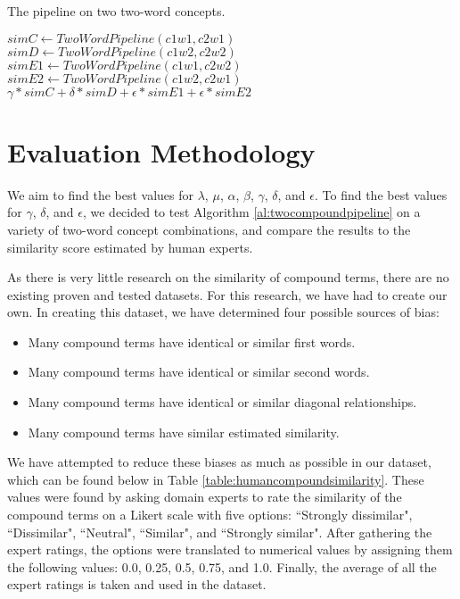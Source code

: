 \documentclass{article}
\begin{document}
\begin{algorithm}
\caption{The pipeline on two two-word concepts.}\label{al:twocompoundpipeline}
\begin{algorithmic}[1]
		\State $\textit{simC} \gets \textit{TwoWordPipeline}(c1w1, c2w1)$
		\State $\textit{simD} \gets \textit{TwoWordPipeline}(c1w2, c2w2)$
		\State $\textit{simE1} \gets \textit{TwoWordPipeline}(c1w1, c2w2)$
		\State $\textit{simE2} \gets \textit{TwoWordPipeline}(c1w2, c2w1)$
		\State \Return $\gamma * \textit{simC} + \delta * \textit{simD} + \epsilon * \textit{simE1} + \epsilon * \textit{simE2}$
	\EndProcedure
\end{algorithmic}
\end{algorithm}

\section{Evaluation Methodology} \label{sec:evalmeth}

We aim to find the best values for $\lambda$, $\mu$, $\alpha$, $\beta$, $\gamma$, $\delta$, and $\epsilon$. To find the best values for $\gamma$, $\delta$, and $\epsilon$, we decided to test Algorithm \ref{al:twocompoundpipeline} on a variety of two-word concept combinations, and compare the results to the similarity score estimated by human experts.

As there is very little research on the similarity of compound terms, there are no existing proven and tested datasets. For this research, we have had to create our own. In creating this dataset, we have determined four possible sources of bias:
\begin{itemize}
	\item Many compound terms have identical or similar first words.
	\item Many compound terms have identical or similar second words.
	\item Many compound terms have identical or similar diagonal relationships.
	\item Many compound terms have similar estimated similarity.
\end{itemize}
We have attempted to reduce these biases as much as possible in our dataset, which can be found below in Table \ref{table:humancompoundsimilarity}. These values were found by asking domain experts to rate the similarity of the compound terms on a Likert scale with five options: ``Strongly dissimilar", ``Dissimilar", ``Neutral", ``Similar", and ``Strongly similar". After gathering the expert ratings, the options were translated to numerical values by assigning them the following values: 0.0, 0.25, 0.5, 0.75, and 1.0. Finally, the average of all the expert ratings is taken and used in the dataset.
\end{document}
